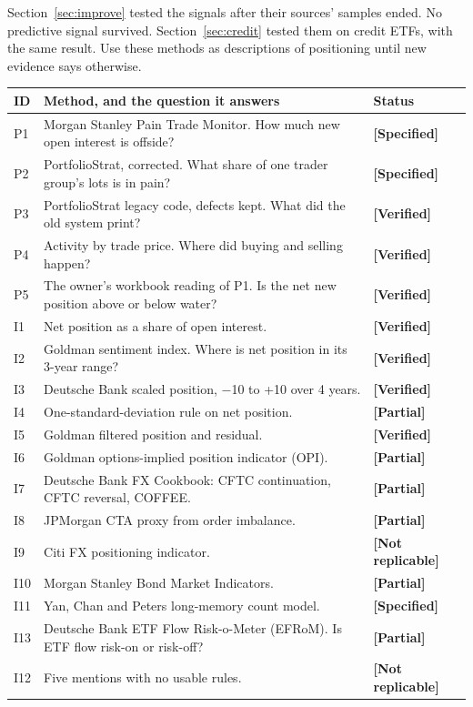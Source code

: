 \documentclass[11pt,a4paper]{article}
\newcommand{\chip}[2]{\textcolor{#1}{\sffamily\footnotesize\bfseries[#2]}}
\newcommand{\Verified}{\chip{okc}{Verified}}
\newcommand{\Specified}{\chip{specc}{Specified}}
\newcommand{\Partial}{\chip{partc}{Partial}}
\newcommand{\NotRep}{\chip{noc}{Not replicable}}
\newcommand{\sublabel}[1]{\par\vspace{3pt}\needspace{3\baselineskip}{\sffamily\small\bfseries #1}\par\nopagebreak[4]\vspace{1pt}}
\begin{document}
\begin{warnbox}
Section~\ref{sec:improve} tested the signals after their sources' samples ended. No predictive signal survived. Section~\ref{sec:credit} tested them on credit ETFs, with the same result. Use these methods as descriptions of positioning until new evidence says otherwise.
\end{warnbox}

\sublabel{The method map}
\small
\begin{tabularx}{\linewidth}{@{}lXl@{}}
\toprule
ID & Method, and the question it answers & Status \\
\midrule
P1 & Morgan Stanley Pain Trade Monitor. How much new open interest is offside? & \Specified \\
P2 & PortfolioStrat, corrected. What share of one trader group's lots is in pain? & \Specified \\
P3 & PortfolioStrat legacy code, defects kept. What did the old system print? & \Verified \\
P4 & Activity by trade price. Where did buying and selling happen? & \Verified \\
P5 & The owner's workbook reading of P1. Is the net new position above or below water? & \Verified \\
\midrule
I1 & Net position as a share of open interest. & \Verified \\
I2 & Goldman sentiment index. Where is net position in its 3-year range? & \Verified \\
I3 & Deutsche Bank scaled position, $-$10 to +10 over 4 years. & \Verified \\
I4 & One-standard-deviation rule on net position. & \Partial \\
I5 & Goldman filtered position and residual. & \Verified \\
I6 & Goldman options-implied position indicator (OPI). & \Partial \\
I7 & Deutsche Bank FX Cookbook: CFTC continuation, CFTC reversal, COFFEE. & \Partial \\
I8 & JPMorgan CTA proxy from order imbalance. & \Partial \\
I9 & Citi FX positioning indicator. & \NotRep \\
I10 & Morgan Stanley Bond Market Indicators. & \Partial \\
I11 & Yan, Chan and Peters long-memory count model. & \Specified \\
I13 & Deutsche Bank ETF Flow Risk-o-Meter (EFRoM). Is ETF flow risk-on or risk-off? & \Partial \\
I12 & Five mentions with no usable rules. & \NotRep \\
\bottomrule
\end{tabularx}
\normalsize
\end{document}
